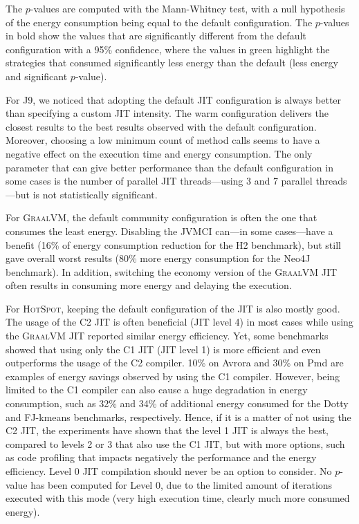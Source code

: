 The $p$-values are computed with the Mann-Whitney test, with a null hypothesis of the energy consumption being equal to the default configuration.
The $p$-values in bold show the values that are significantly different from the default configuration with a 95\% confidence, where the values in green highlight the strategies that consumed significantly less energy than the default (less energy and significant $p$-value).



For \textsc{J9}, we noticed that adopting the default JIT configuration is always better than specifying a custom JIT intensity.
The \textsf{warm} configuration delivers the closest results to the best results observed with the default configuration.
Moreover, choosing a low minimum count of method calls seems to have a negative effect on the execution time and energy consumption.
The only parameter that can give better performance than the default configuration in some cases is the number of parallel JIT threads---using 3 and 7 parallel threads---but is not statistically significant.

For \textsc{GraalVM}, the default community configuration is often the one that consumes the least energy.
Disabling the JVMCI can---in some cases---have a benefit (16\% of energy consumption reduction for the \textsf{H2} benchmark), but still gave overall worst results (80\% more energy consumption for the \textsf{Neo4J} benchmark).
In addition, switching the economy version of the \textsc{GraalVM} JIT often results in consuming more energy and delaying the execution.

For \textsc{HotSpot}, keeping the default configuration of the JIT is also mostly good.
The usage of the C2 JIT is often beneficial (JIT level 4) in most cases while using the \textsc{GraalVM} JIT reported similar energy efficiency.
Yet, some benchmarks showed that using only the C1 JIT (JIT level 1) is more efficient and even outperforms the usage of the C2 compiler.
10\% on \textsf{Avrora} and 30\% on \textsf{Pmd} are examples of energy savings observed by using the C1 compiler.
However, being limited to the C1 compiler can also cause a huge degradation in energy consumption, such as 32\% and 34\% of additional energy consumed for the \textsf{Dotty} and \textsf{FJ-kmeans} benchmarks, respectively.
Hence, if it is a matter of not using the C2 JIT, the experiments have shown that the level 1 JIT is always the best, compared to levels 2 or 3 that also use the C1 JIT, but with more options, such as code profiling that impacts negatively the performance and the energy efficiency.
Level 0 JIT compilation should never be an option to consider.
No $p$-value has been computed for Level 0, due to the limited amount of iterations executed with this mode (very high execution time, clearly much more consumed energy).

